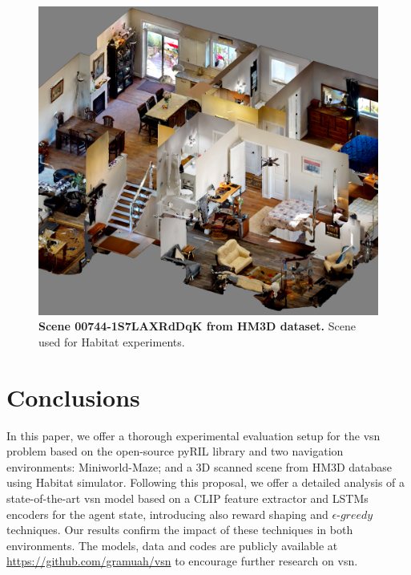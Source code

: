 \begin{figure}
    \centering
    \includegraphics[width=0.6\linewidth]{figures/understanding_vsn/dollhouse}
    \caption{\textbf{Scene 00744-1S7LAXRdDqK from HM3D dataset.} Scene used for Habitat experiments.}
    \label{fig:dollhouse}
\end{figure}

\section{Conclusions}
\label{sec:conclusions}

In this paper, we offer a thorough experimental evaluation setup for the \acrshort{vsn} problem based on the open-source pyRIL library and two navigation environments: Miniworld-Maze; and a 3D scanned scene from HM3D database using Habitat simulator.
Following this proposal, we offer a detailed analysis of a state-of-the-art \acrshort{vsn} model based on a CLIP feature extractor and LSTMs encoders for the agent state, introducing also reward shaping and $\epsilon\text{-}greedy$ techniques.
Our results confirm the impact of these techniques in both environments.
The models, data and codes are publicly available at \url{https://github.com/gramuah/vsn} to encourage further research on \acrshort{vsn}\@.

